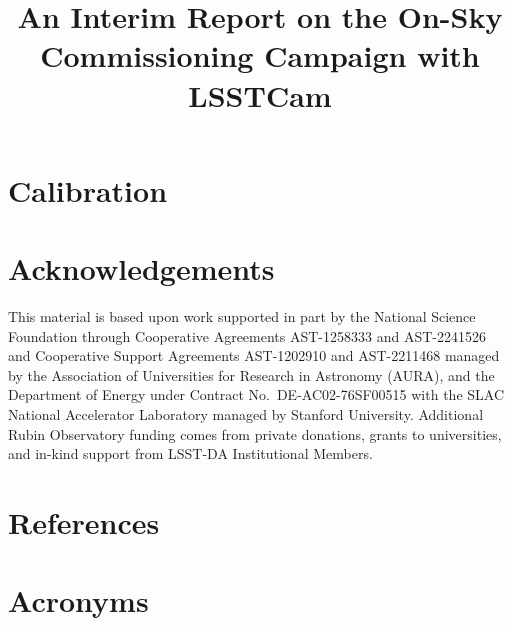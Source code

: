 \documentclass[SE,lsstdraft,authoryear,toc]{lsstdoc}
\title{An Interim Report on the On-Sky Commissioning Campaign with LSSTCam}
\date{\vcsDate}
\begin{document}
\maketitle




















\section{Calibration}
\label{sec:calibration}





\appendix

\section{Acknowledgements}

This material is based upon work supported in part by the National Science Foundation through Cooperative Agreements AST-1258333 and AST-2241526 and Cooperative Support Agreements AST-1202910 and AST-2211468 managed by the Association of Universities for Research in Astronomy (AURA), and the Department of Energy under Contract No.\ DE-AC02-76SF00515 with the SLAC National Accelerator Laboratory managed by Stanford University.
Additional Rubin Observatory funding comes from private donations, grants to universities, and in-kind support from LSST-DA Institutional Members.

\section{References} \label{sec:bib}
\renewcommand{\refname}{} %


\section{Acronyms} \label{sec:acronyms}

\end{document}
